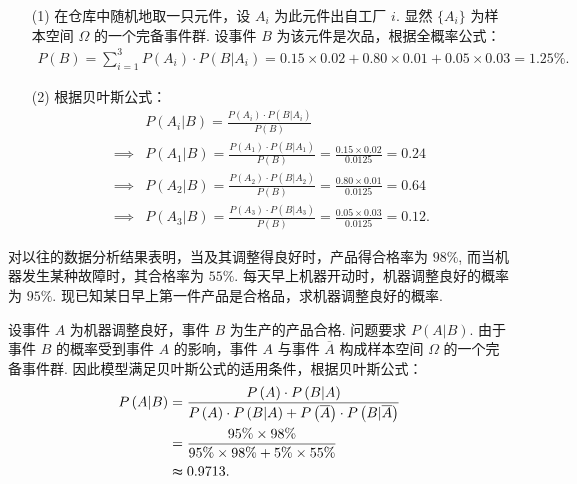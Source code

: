 \documentclass[12pt, a4paper, oneside, UTF8]{ctexbook}
\begin{document}
\begin{solution}
    \begin{enumerate}
        \item[(1)] 在仓库中随机地取一只元件，设 \(A_i\) 为此元件出自工厂 \(i\). 显然 \(\{A_i\}\) 为样本空间 \(\Omega\) 的一个完备事件群. 设事件 \(B\) 为该元件是次品，根据全概率公式：
        \begin{align*}
            P\left(B\right) = \sum_{i = 1}^{3} P\left(A_i\right) \cdot P\left(B | A_i\right) = 0.15 \times 0.02 + 0.80 \times 0.01 + 0.05 \times 0.03 = 1.25\%.
        \end{align*}
        \item[(2)] 根据贝叶斯公式：
        \begin{align*}
            & P\left(A_i | B\right) = \frac{P\left(A_i\right) \cdot P\left(B | A_i\right)}{P\left(B\right)} \\
            \implies & P\left(A_1 | B\right) = \frac{P\left(A_1\right) \cdot P\left(B | A_1\right)}{P\left(B\right)} = \frac{0.15 \times 0.02}{0.0125} = 0.24 \\
            \implies & P\left(A_2 | B\right) = \frac{P\left(A_2\right) \cdot P\left(B | A_2\right)}{P\left(B\right)} = \frac{0.80 \times 0.01}{0.0125} = 0.64 \\
            \implies & P\left(A_3 | B\right) = \frac{P\left(A_3\right) \cdot P\left(B | A_3\right)}{P\left(B\right)} = \frac{0.05 \times 0.03}{0.0125} = 0.12.
        \end{align*}
    \end{enumerate}
\end{solution}

\begin{example}
    对以往的数据分析结果表明，当及其调整得良好时，产品得合格率为 \(98\%\), 而当机器发生某种故障时，其合格率为 \(55\%\). 每天早上机器开动时，机器调整良好的概率为 \(95\%\). 现已知某日早上第一件产品是合格品，求机器调整良好的概率.
\end{example}

\begin{solution}
    设事件 \(A\) 为机器调整良好，事件 \(B\) 为生产的产品合格. 问题要求 \(P(A | B)\). 由于事件 \(B\) 的概率受到事件 \(A\) 的影响，事件 \(A\) 与事件 \(\overline{A}\) 构成样本空间 \(\Omega\) 的一个完备事件群. 因此模型满足贝叶斯公式的适用条件，根据贝叶斯公式：
    \begin{align*}
        P\left(A | B\right) &= \frac{P\left(A\right)\cdot P\left(B | A\right)}{P\left(A\right)\cdot P\left(B|A\right) + P\left(\overline{A}\right)\cdot P\left(B | \overline{A}\right)} \\
        &= \frac{95\% \times 98\%}{95\% \times 98\% + 5\% \times 55\%} \\
        &\thickapprox 0.9713.
    \end{align*}
\end{solution}
\end{document}

